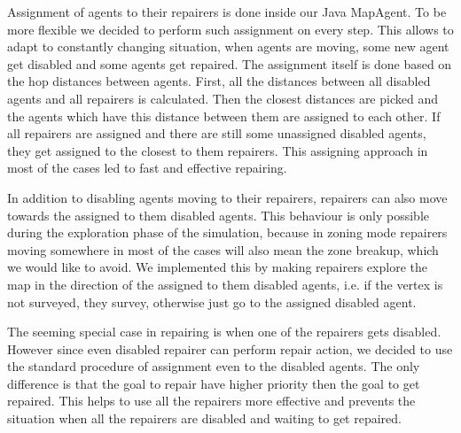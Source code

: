 Assignment of agents to their repairers is done inside our Java MapAgent. To be more flexible we decided to perform such assignment on every step. This allows to adapt to constantly changing situation, when agents are moving, some new agent get disabled and some agents get repaired. The assignment itself is done based on the hop distances between agents. First, all the distances between all disabled agents and all repairers is calculated. Then the closest distances are picked and the agents which have this distance between them are assigned to each other. If all repairers are assigned and there are still some unassigned disabled agents, they get assigned to the closest to them repairers. This assigning approach in most of the cases led to fast and effective repairing.

In addition to disabling agents moving to their repairers, repairers can also move towards the assigned to them disabled agents. This behaviour is only possible during the exploration phase of the simulation, because in zoning mode repairers moving somewhere in most of the cases will also mean the zone breakup, which we would like to avoid. We implemented this by making repairers explore the map in the direction of the assigned to them disabled agents, i.e. if the vertex is not surveyed, they survey, otherwise just go to the assigned disabled agent.

The seeming special case in repairing is when one of the repairers gets disabled. However since even disabled repairer can perform repair action, we decided to use the standard procedure of assignment even to the disabled agents. The only difference is that the goal to repair have higher priority then the goal to get repaired. This helps to use all the repairers more effective and prevents the situation when all the repairers are disabled and waiting to get repaired.

